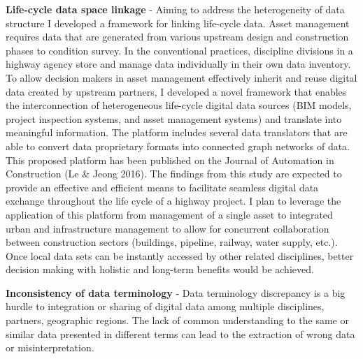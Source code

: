 \documentclass[a4paper,11pt]{article}
\begin{document}

\par
{\bf Life-cycle data space linkage} - Aiming to address the heterogeneity of data structure I developed a framework for linking life-cycle data. Asset management requires data that are generated from various upstream design and construction phases to condition survey. 
%
In the conventional practices, discipline divisions in a highway agency store and manage data individually in their own data inventory.
%
To allow decision makers in asset management effectively inherit and reuse digital data created by upstream partners, I developed a novel framework that enables the interconnection of heterogeneous life-cycle digital data sources (BIM models, project inspection systems, and asset management systems) and translate into meaningful information.
%
The platform includes several data translators that are able to convert data proprietary formats into connected graph networks of data.
%
This proposed platform has been published on the Journal of Automation in Construction (Le \& Jeong 2016). 
%
The findings from this study are expected to provide an effective and efficient means to facilitate seamless digital data exchange throughout the life cycle of a highway project. 
%
I plan to leverage the application of this platform from management of a single asset to integrated urban and infrastructure management to allow for concurrent collaboration between construction sectors (buildings, pipeline, railway, water supply, etc.).
%
Once local data sets can be instantly accessed by other related disciplines, better decision making with holistic and long-term benefits would be achieved.
\par
{\bf Inconsistency of data terminology} - Data terminology discrepancy is a big hurdle to integration or sharing of digital data among multiple disciplines, partners, geographic regions. 
%
The lack of common understanding to the same or similar data presented in different terms can lead to the extraction of wrong data or misinterpretation. 
%
\end{document}
